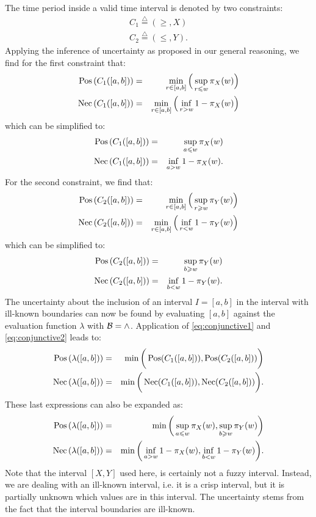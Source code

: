 The time period inside a valid time interval is denoted by two constraints:
\begin{eqnarray}
C_1\stackrel{\triangle}{=}\left(\geq,X\right)\\
C_2\stackrel{\triangle}{=}\left(\leq,Y\right).
\end{eqnarray}
Applying the inference of uncertainty as proposed in our general reasoning, we find for the first constraint that:
\begin{eqnarray}
\operatorname{Pos}\left(C_1([a,b])\right) &=& \min_{r\in[a,b]}\Big(\sup_{r\leqslant w}\pi_{X}(w)\Big)\\
\operatorname{Nec}\left(C_1([a,b])\right) &=& \min_{r\in[a,b]}\Big(\inf_{r>w}1-\pi_{X}(w)\Big)
\end{eqnarray}
which can be simplified to:
\begin{eqnarray}
\operatorname{Pos}\left(C_1([a,b])\right) &=& \sup_{a\leqslant w}\pi_{X}(w)\\
\operatorname{Nec}\left(C_1([a,b])\right) &=& \inf_{a>w}1-\pi_{X}(w).
\end{eqnarray}
For the second constraint, we find that:
\begin{eqnarray}
\operatorname{Pos}\left(C_2([a,b])\right) &=& \min_{r\in[a,b]}\Big(\sup_{r\geqslant w}\pi_{Y}(w)\Big)\\
\operatorname{Nec}\left(C_2([a,b])\right) &=& \min_{r\in[a,b]}\Big(\inf_{r<w}1-\pi_{Y}(w)\Big)
\end{eqnarray}
which can be simplified to:
\begin{eqnarray}
\operatorname{Pos}\left(C_2([a,b])\right) &=& \sup_{b\geqslant w}\pi_{Y}(w)\\
\operatorname{Nec}\left(C_2([a,b])\right) &=& \inf_{b<w}1-\pi_{Y}(w).
\end{eqnarray}
The uncertainty about the inclusion of an interval $I=[a,b]$ in the interval with ill-known boundaries can now be found by evaluating $[a,b]$ against the evaluation function $\lambda$ with $\operatorname*{\mathcal{B}}=\wedge$. Application of \eqref{eq:conjunctive1} and \eqref{eq:conjunctive2} leads to:
\begin{eqnarray}
\operatorname{Pos}\left(\lambda([a,b])\right)&=&\min\bigg(\operatorname{Pos}(C_1([a,b])),\operatorname{Pos}(C_2([a,b]))\bigg)\\
\operatorname{Nec}\left(\lambda([a,b])\right)&=&\min\bigg(\operatorname{Nec}(C_1([a,b])),\operatorname{Nec}(C_2([a,b]))\bigg).
\end{eqnarray}
These last expressions can also be expanded as:
\begin{eqnarray}
\label{eq:interval-pos}
\operatorname{Pos}\left(\lambda([a,b])\right)&=&\min\bigg(\sup_{a\leqslant w}\pi_{X}(w),\sup_{b\geqslant w}\pi_{Y}(w)\bigg)\\
\label{eq:interval-nec}
\operatorname{Nec}\left(\lambda([a,b])\right)&=&\min\bigg(\inf_{a>w}1-\pi_{X}(w),\inf_{b<w}1-\pi_{Y}(w)\bigg).
\end{eqnarray}
Note that the interval $[X,Y]$ used here, is certainly not a fuzzy interval. Instead, we are dealing with an ill-known interval, i.e. it is a crisp interval, but it is partially unknown which values are in this interval. The uncertainty stems from the fact that the interval boundaries are ill-known.

